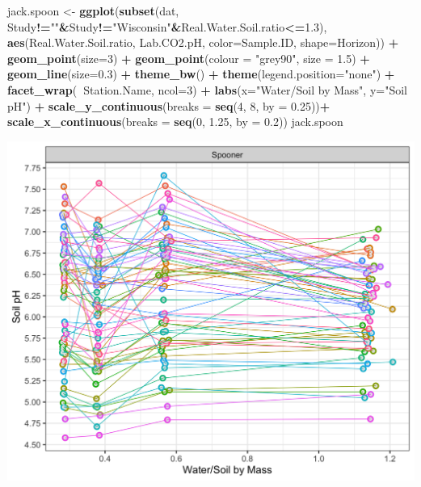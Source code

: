\documentclass[]{article}
\newenvironment{Shaded}{\begin{snugshade}}{\end{snugshade}}
\newcommand{\DataTypeTok}[1]{\textcolor[rgb]{0.13,0.29,0.53}{#1}}
\newcommand{\DecValTok}[1]{\textcolor[rgb]{0.00,0.00,0.81}{#1}}
\newcommand{\FloatTok}[1]{\textcolor[rgb]{0.00,0.00,0.81}{#1}}
\newcommand{\KeywordTok}[1]{\textcolor[rgb]{0.13,0.29,0.53}{\textbf{#1}}}
\newcommand{\NormalTok}[1]{#1}
\newcommand{\OperatorTok}[1]{\textcolor[rgb]{0.81,0.36,0.00}{\textbf{#1}}}
\newcommand{\StringTok}[1]{\textcolor[rgb]{0.31,0.60,0.02}{#1}}
\begin{document}
\begin{Shaded}
\begin{Highlighting}[]
\NormalTok{jack.spoon <-}\StringTok{ }\KeywordTok{ggplot}\NormalTok{(}\KeywordTok{subset}\NormalTok{(dat, Study}\OperatorTok{!=}\StringTok{""}\OperatorTok{&}\NormalTok{Study}\OperatorTok{!=}\StringTok{"Wisconsin"}\OperatorTok{&}\NormalTok{Real.Water.Soil.ratio}\OperatorTok{<=}\FloatTok{1.3}\NormalTok{), }\KeywordTok{aes}\NormalTok{(Real.Water.Soil.ratio, Lab.CO2.pH, }\DataTypeTok{color=}\NormalTok{Sample.ID, }\DataTypeTok{shape=}\NormalTok{Horizon)) }\OperatorTok{+}\StringTok{ }
\StringTok{  }\KeywordTok{geom_point}\NormalTok{(}\DataTypeTok{size=}\DecValTok{3}\NormalTok{) }\OperatorTok{+}\StringTok{ }\KeywordTok{geom_point}\NormalTok{(}\DataTypeTok{colour =} \StringTok{"grey90"}\NormalTok{, }\DataTypeTok{size =} \FloatTok{1.5}\NormalTok{) }\OperatorTok{+}\StringTok{ }\KeywordTok{geom_line}\NormalTok{(}\DataTypeTok{size=}\FloatTok{0.3}\NormalTok{) }\OperatorTok{+}\StringTok{ }\KeywordTok{theme_bw}\NormalTok{() }\OperatorTok{+}\StringTok{ }\KeywordTok{theme}\NormalTok{(}\DataTypeTok{legend.position=}\StringTok{"none"}\NormalTok{) }\OperatorTok{+}
\StringTok{  }\KeywordTok{facet_wrap}\NormalTok{(}\OperatorTok{~}\NormalTok{Station.Name, }\DataTypeTok{ncol=}\DecValTok{3}\NormalTok{) }\OperatorTok{+}\StringTok{ }\KeywordTok{labs}\NormalTok{(}\DataTypeTok{x=}\StringTok{"Water/Soil by Mass"}\NormalTok{, }\DataTypeTok{y=}\StringTok{"Soil pH"}\NormalTok{) }\OperatorTok{+}\StringTok{ }
\StringTok{  }\KeywordTok{scale_y_continuous}\NormalTok{(}\DataTypeTok{breaks =} \KeywordTok{seq}\NormalTok{(}\DecValTok{4}\NormalTok{, }\DecValTok{8}\NormalTok{, }\DataTypeTok{by =} \FloatTok{0.25}\NormalTok{))}\OperatorTok{+}
\StringTok{  }\KeywordTok{scale_x_continuous}\NormalTok{(}\DataTypeTok{breaks =} \KeywordTok{seq}\NormalTok{(}\DecValTok{0}\NormalTok{, }\FloatTok{1.25}\NormalTok{, }\DataTypeTok{by =} \FloatTok{0.2}\NormalTok{))}
\NormalTok{jack.spoon}
\end{Highlighting}
\end{Shaded}

\includegraphics{output-rmd/jackson-plot-ph-spooner-1.png}
\end{document}
